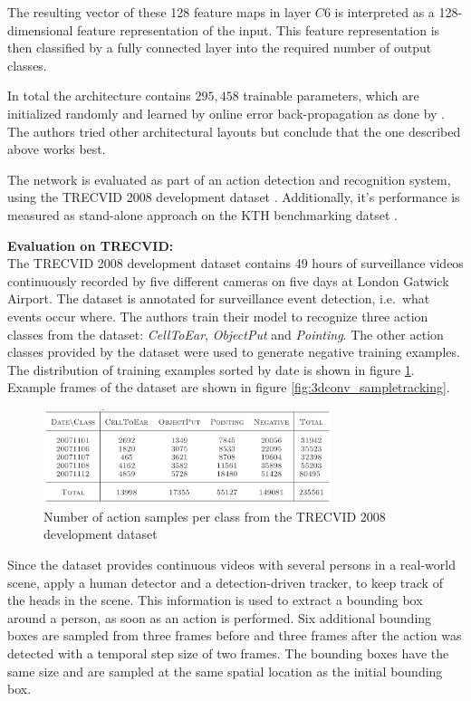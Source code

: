 The resulting vector of these 128 feature maps in layer $C6$ is interpreted as a 128-dimensional feature representation of the input.
This feature representation is then classified by a fully connected layer into the required number of output classes.

In total the architecture contains $295,458$ trainable parameters, which are initialized randomly and learned by online error back-propagation as done by \textcite{lecun_gradient-based_1998-1}.
The authors tried other architectural layouts but conclude that the one described above works best.

The network is evaluated as part of an action detection and recognition system, using the TRECVID 2008 development dataset \cite{rose_trecvid_2009}.
Additionally, it's performance is measured as stand-alone approach on the KTH benchmarking datset \cite{schuldt_recognizing_2004}.

\textbf{Evaluation on TRECVID:} \\
The TRECVID 2008 development dataset \cite{rose_trecvid_2009} contains 49 hours of surveillance videos continuously recorded by five different cameras on five days at London Gatwick Airport.
The dataset is annotated for surveillance event detection, i.e.\ what events occur where.
The authors train their model to recognize three action classes from the dataset: \textit{CellToEar}, \textit{ObjectPut} and \textit{Pointing}.
The other action classes provided by the dataset were used to generate negative training examples.
The distribution of training examples sorted by date is shown in figure \ref{fig:3dconv_dataset}.
Example frames of the dataset are shown in figure \ref{fig:3dconv_sampletracking}.

\begin{figure}[H]
    \centering
    \includegraphics[width=0.75\textwidth]{img_deep/3dconv_dataset}
    \caption{Number of action samples per class from the TRECVID 2008 development dataset \cite{ji_3d_2013}}
    \label{fig:3dconv_dataset}
\end{figure}

Since the dataset provides continuous videos with several persons in a real-world scene, \textcite{ji_3d_2013} apply a human detector and a detection-driven tracker, to keep track of the heads in the scene.
This information is used to extract a bounding box around a person, as soon as an action is performed. 
Six additional bounding boxes are sampled from three frames before and three frames after the action was detected with a temporal step size of two frames.
The bounding boxes have the same size and are sampled at the same spatial location as the initial bounding box.

